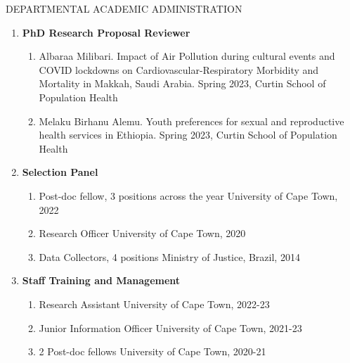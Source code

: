 \begin{rSection}{DEPARTMENTAL ACADEMIC ADMINISTRATION}

\begin{enumerate}[label=\Roman*]

\item {\textbf{PhD Research Proposal Reviewer}}
\par

\begin{enumerate}[label=(\roman*)]

\item {Albaraa Milibari. Impact of Air Pollution during cultural events and COVID lockdowns  on Cardiovascular-Respiratory Morbidity and Mortality in Makkah, Saudi Arabia. Spring 2023, Curtin School of Population Health}\par

\item {Melaku Birhanu Alemu. Youth preferences for sexual and reproductive health services in Ethiopia. Spring 2023, Curtin School of Population Health}
\end{enumerate}

\item {\textbf {Selection Panel}}
\par

\begin{enumerate}[label=(\roman*)]
\item{Post-doc fellow, 3 positions across the year} \hfill{University of Cape Town, 2022}

\item{Research Officer} \hfill{University of Cape Town, 2020}

\item{Data Collectors, 4 positions} \hfill{Ministry of Justice, Brazil, 2014}
\end{enumerate}

\item{\textbf {Staff Training and Management}}
\par

\begin{enumerate}[label=(\roman*)]
\item {Research Assistant} \hfill{University of Cape Town, 2022-23}

\item {Junior Information Officer} \hfill{University of Cape Town, 2021-23}

\item {2 Post-doc fellows} \hfill{University of Cape Town, 2020-21}


\end{enumerate}
\end{enumerate}
\end{rSection}
